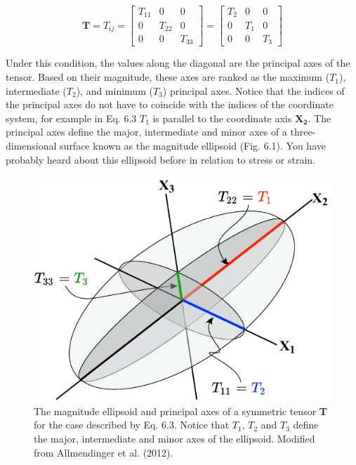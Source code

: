 \documentclass[a4paper , 12pt]{book}
\begin{document}
\begin{equation}
    \mathbf{T}=T_{ij}=\begin{bmatrix}T_{11}&0&0\\0&T_{22}&0\\0&0&T_{33}\end{bmatrix}=\begin{bmatrix}T_2&0&0\\0&T_1&0\\0&0&T_3\end{bmatrix}
\end{equation}

Under this condition, the values along the diagonal are the principal axes of the tensor. Based on their magnitude, these axes are ranked as the maximum ($T_1$), intermediate ($T_2$), and minimum ($T_3$) principal axes. Notice that the indices of the principal axes do not have to coincide with the indices of the coordinate system, for example in Eq. 6.3 $T_1$ is parallel to the coordinate axis $\mathbf{X_2}$. The principal axes define the major, intermediate and minor axes of a three-dimensional surface known as the magnitude ellipsoid (Fig. 6.1). You have probably heard about this ellipsoid before in relation to stress or strain. 

\begin{figure}[ht]
    \centering
    \includegraphics{ch6f1.pdf}
    \caption{The magnitude ellipsoid and principal axes of a symmetric tensor \textbf{T} for the case described by Eq. 6.3. Notice that $T_1$, $T_2$ and $T_3$ define the major, intermediate and minor axes of the ellipsoid. Modified from Allmendinger et al. (2012).}
    \end{figure}
    
\end{document}
